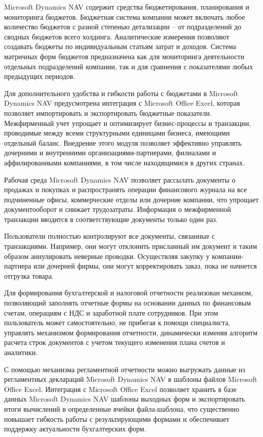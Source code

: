 \documentclass[14pt,a4paper]{reportmod}
\begin{document}
Microsoft Dynamics NAV содержит средства бюджетирования, планирования и мониторинга бюджетов. Бюджетная система компании может включать любое количество бюджетов с разной степенью детализации – от подразделений до сводных бюджетов всего холдинга. Аналитические измерения позволяют создавать бюджеты по индивидуальным статьям затрат и доходов. Система матричных форм бюджетов предназначена как для мониторинга деятельности отдельных подразделений компании, так и для сравнения с показателями любых предыдущих периодов.


Для дополнительного удобства и гибкости работы с бюджетами в Microsoft Dynamics NAV предусмотрена интеграция с Microsoft Office Excel, которая позволяет импортировать и экспортировать бюджетные показатели.
Межфирменный учет упрощает и оптимизирует бизнес-процессы и транзакции, проводимые между всеми структурными единицами бизнеса, имеющими отдельный баланс. Внедрение этого модуля позволяет эффективно управлять дочерними и внутренними организациями-партнерами, филиалами и аффилированными компаниями, в том числе находящимися в других странах.


Рабочая среда Microsoft Dynamics NAV позволяет рассылать документы о продажах и покупках и распространять операции финансового журнала на все подчиненные офисы, коммерческие отделы или дочерние компании, что упрощает документооборот и снижает трудозатраты. Информация о межфирменной транзакции вводится в соответствующие документы только один раз.


Пользователи полностью контролируют все документы, связанные с транзакциями. Например, они могут отклонить присланный им документ и таким образом аннулировать неверные проводки. Осуществляя закупку у компании-партнера или дочерней фирмы, они могут корректировать заказ, пока не начнется отгрузка товара.


Для формирования бухгалтерской и налоговой отчетности реализован механизм, позволяющий заполнять отчетные формы на основании данных по финансовым счетам, операциям с НДС и заработной плате сотрудников. При этом пользователь может самостоятельно, не прибегая к помощи специалиста, управлять механизмом формирования отчетности, динамически изменяя алгоритм расчета строк документов с учетом текущего изменения плана счетов и аналитики.


С помощью механизма регламентной отчетности можно выгружать данные из регламентных деклараций Microsoft Dynamics NAV в шаблоны файлов Microsoft Office Excel. Интеграция с Microsoft Office Excel позволяет хранить в базе данных Microsoft Dynamics NAV шаблоны выходных форм и экспортировать итоги вычислений в определенные ячейки файла-шаблона, что существенно повышает гибкость работы с результирующими формами и обеспечивает поддержку актуальности бухгалтерских форм.
\end{document}
